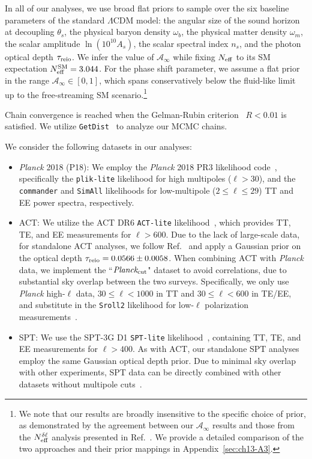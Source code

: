 In all of our analyses, we use broad flat priors to sample over the six baseline parameters of the standard $\Lambda$CDM model: the angular size of the sound horizon at decoupling $\theta_s$, the physical baryon density $\omega_b$, the physical matter density $\omega_m$, the scalar amplitude $\ln(10^{10}A_s)$, the scalar spectral index $n_s$, and the photon optical depth $\tau_{\rm reio}$.
We infer the value of $\mathcal{A}_\infty$ while fixing $N_\mathrm{eff}$ to its SM expectation $N_\mathrm{eff}^{\rm SM} = 3.044$. For the phase shift parameter, we assume a flat prior in the range $\mathcal{A}_\infty \in[0, 1]$, which spans conservatively below the fluid-like limit up to the free-streaming SM scenario.\footnote{We note that our results are broadly insensitive to the specific choice of prior, as demonstrated by the agreement between our $\mathcal{A}_\infty$ results and those from the $N_\mathrm{eff}^{\delta\ell}$ analysis presented in Ref.~\cite{Montefalcone:2025unv}. We provide a detailed comparison of the two approaches and their prior mappings in Appendix~\ref{sec:ch13-A3}.}

Chain convergence is reached when the Gelman-Rubin criterion~\cite{Gelman:1992zz} $R < 0.01$ is satisfied. We utilize \texttt{GetDist}~\cite{Lewis:2019xzd} to analyze our MCMC chains.
\smallskip

We consider the following datasets in our analyses:
\begin{itemize}
    \item \textit{Planck} 2018 (P18): We employ the \textit{Planck} 2018 PR3 likelihood code~\cite{Planck:2019nip}, specifically the \texttt{plik-lite} likelihood for high multipoles ($\ell>30$), and the \texttt{commander} and \texttt{SimAll} likelihoods for low-multipole ($2\leq \ell \leq 29$) TT and EE power spectra, respectively.
    \item ACT: We utilize the ACT DR6 \texttt{ACT-lite} likelihood~\cite{ACT:2025fju}, which provides TT, TE, and EE measurements for $\ell>600$. Due to the lack of large-scale data, for standalone ACT analyses, we follow Ref.~\cite{ACT:2025fju} and apply a Gaussian prior on the optical depth $\tau_{\rm reio}= 0.0566\pm 0.0058$. When combining ACT with \textit{Planck} data, we implement the ``$\it{Planck_{\rm cut}}$" dataset to avoid correlations, due to substantial sky overlap between the two surveys. Specifically, we only use \textit{Planck} high-$\ell$ data, $30\leq \ell < 1000$ in TT and $30\leq \ell < 600$ in TE/EE, and substitute in the \texttt{Sroll2} likelihood for low-$\ell$ polarization measurements~\cite{ACT:2025fju}.
    \item SPT: We use the SPT-3G D1 \texttt{SPT-lite} likelihood~\cite{SPT-3G:2025bzu}, containing TT, TE, and EE measurements for $\ell>400$. As with ACT, our standalone SPT analyses employ the same Gaussian optical depth prior. Due to minimal sky overlap with other experiments, SPT data can be directly combined with other datasets without multipole cuts~\cite{SPT-3G:2025zuh}.
\end{itemize}

